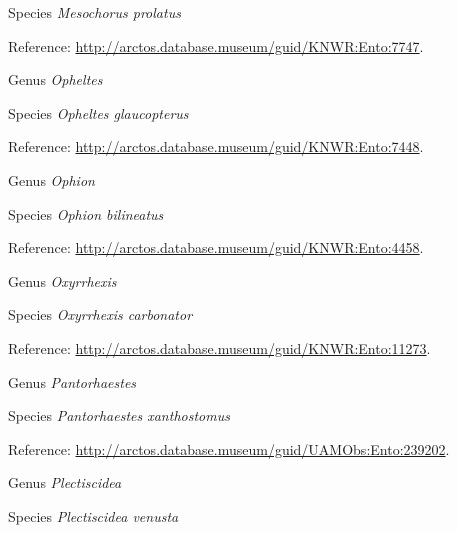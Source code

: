 \documentclass[9pt, article]{memoir}
\begin{document}
\begin{multicols}{2}
\vspace{6pt}\noindent\hspace{36pt}Species \textit{Mesochorus prolatus}


Reference: 
\url{http://arctos.database.museum/guid/KNWR:Ento:7747}.

\vspace{6pt}\noindent\hspace{30pt}Genus \textit{Opheltes}


\vspace{6pt}\noindent\hspace{36pt}Species \textit{Opheltes glaucopterus}


Reference: 
\url{http://arctos.database.museum/guid/KNWR:Ento:7448}.

\vspace{6pt}\noindent\hspace{30pt}Genus \textit{Ophion}


\vspace{6pt}\noindent\hspace{36pt}Species \textit{Ophion bilineatus}


Reference: 
\url{http://arctos.database.museum/guid/KNWR:Ento:4458}.

\vspace{6pt}\noindent\hspace{30pt}Genus \textit{Oxyrrhexis}


\vspace{6pt}\noindent\hspace{36pt}Species \textit{Oxyrrhexis carbonator}


Reference: 
\url{http://arctos.database.museum/guid/KNWR:Ento:11273}.

\vspace{6pt}\noindent\hspace{30pt}Genus \textit{Pantorhaestes}


\vspace{6pt}\noindent\hspace{36pt}Species \textit{Pantorhaestes xanthostomus}


Reference: 
\url{http://arctos.database.museum/guid/UAMObs:Ento:239202}.

\vspace{6pt}\noindent\hspace{30pt}Genus \textit{Plectiscidea}


\vspace{6pt}\noindent\hspace{36pt}Species \textit{Plectiscidea venusta}



\end{multicols}
\end{document}
